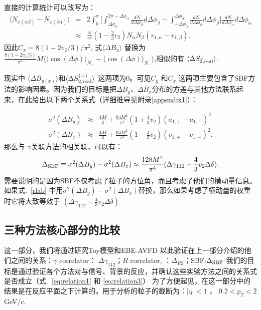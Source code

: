 直接的计算统计可以改写为：
\begin{eqnarray}
\langle N_{x(\alpha\beta)}-N_{x(\beta\alpha)} \rangle &=& 2\int_{0}^{\pi} 
\Big[\int_{\Delta\phi_\alpha}^{2\pi-\Delta\phi_\alpha} \frac{dN}{d\Delta\phi_\beta}d\Delta\phi_\beta-\int^{\Delta\phi_\alpha}_{-\Delta\phi_\alpha} \frac{dN}{d\Delta\phi_\beta}d\Delta\phi_\beta\Big]\frac{dN}{d\Delta\phi_\alpha}d\Delta\phi_\alpha \nonumber \\
&\approx& \frac{8}{\pi^2}(1-\frac{2}{3}v_2)N_\alpha N_\beta (v_{1,\alpha}-v_{1,\beta}).   
\end{eqnarray}
因此$C_x = 8(1-2v_2/3)/\pi^2$, 
式$\langle\Delta B_x\rangle$ 替换为 $\frac{8(1-2v_2/3)}{\pi^2} M \langle\langle \cos(\Delta \phi)\rangle_{N_+} -\langle \cos(\Delta\phi)\rangle_{N_-} \rangle$,相似的有 $\langle \Delta S_{2,\rm real}^{\perp}\rangle$. 

现实中 $\langle\Delta B_{y(x)}\rangle$和$\langle \Delta S_{2,\rm real}^{(\perp)}\rangle$ 这两项为0。可见$C_y$ 和$C_x$ 这两项主要包含了SBF方法的影响因素。因为我们的目标是把$\Delta B_y$、$\Delta B_x$分布的方差与其他方法联系起来，在此给出以下两个关系式（详细推导见附录\ref{appendix1}）：

\begin{eqnarray}
\sigma^2(\Delta B_y) &\approx& \frac{4M}{3}+ \frac{64M^2}{\pi^4}(1+ \frac{4}{3} v_2)(a_{1,+}-a_{1,-})^2 
\\
\sigma^2(\Delta B_x) &\approx& \frac{4M}{3}+ \frac{64M^2}{\pi^4}(1-\frac{4}{3}v_2)(v_{1,+}-v_{1,-})^2 .
\end{eqnarray}
那么与 $\gamma$关联方法的相关联，可以有：
\begin{equation}
\Delta_{\rm SBF} \equiv \sigma^2(\Delta B_y) - \sigma^2(\Delta B_x) \approx  \frac{128M^2}{\pi^4}(\Delta\gamma_{112}-\frac{4}{3}v_2\Delta\delta).   \label{eq:relation3} 
\end{equation}
需要说明的是因为SBF不仅考虑了粒子的方位角，而且考虑了他们的横动量信息。如果式.~\ref{rlab} 中用$\sigma^2(\Delta B_y) - \sigma^2({\Delta B_x})$替换，那么如果考虑了横动量的权重时它将大致等效于 $(\Delta \gamma_{112}-\frac{4}{3}v_2\Delta\delta)$


\subsection{三种方法核心部分的比较}
\label{Sec:kernel}
这一部分，我们将通过研究Toy模型和EBE-AVFD 以此验证在上一部分介绍的他们之间的关系：$\gamma$ correlator： $\Delta \gamma_{112}$；$R$ correlator, ：$\Delta_{R2}$；SBF:$\Delta_{\rm SBF}$
我们的目标是通过验证各个方法对与信号、背景的反应，并确认这些实验方法之间的关系式是否成立（式.~\ref{eq:relation1} 和 \ref{eq:relation3}）
为了方便起见，在这一部分中的结果是在反应平面之下计算的。用于分析的粒子的截断为：$|\eta|<1$ ， $0.2 < p_T < 2$ GeV/$c$.


